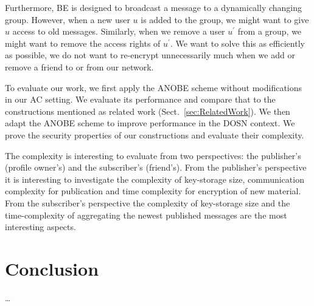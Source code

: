 Furthermore, \ac{BE} is designed to broadcast a message to a dynamically 
changing group.
However, when a new user \(u\) is added to the group, we might want to give 
\(u\) access to old messages.
Similarly, when we remove a user \(u^\prime\) from a group, we might want to 
remove the access rights of \(u^\prime\).
We want to solve this as efficiently as possible, we do not want to re-encrypt 
unnecessarily much when we add or remove a friend to or from our network.


To evaluate our work, we first apply the \ac{ANOBE} scheme without 
modifications in our \ac{AC} setting.
We evaluate its performance and compare that to the constructions mentioned as 
related work (Sect.~\ref{sec:RelatedWork}).
We then adapt the \ac{ANOBE} scheme to improve performance in the \ac{DOSN} 
context.
We prove the security properties of our constructions and evaluate their 
complexity.

The complexity is interesting to evaluate from two perspectives: the 
publisher's (profile owner's) and the subscriber's (friend's).
From the publisher's perspective it is interesting to investigate the 
complexity of key-storage size, communication complexity for publication and 
time complexity for encryption of new material.
From the subscriber's perspective the complexity of key-storage size and the 
time-complexity of aggregating the newest published messages are the most 
interesting aspects.


\section{Conclusion}
\dots




